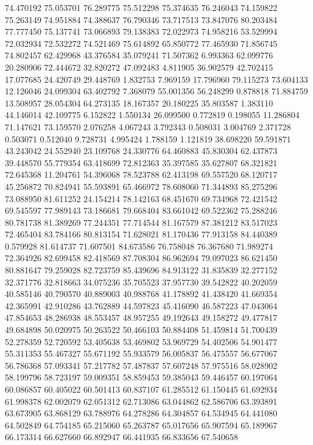 74.470192
75.053701
76.289775
75.512298
75.374635
76.246043
74.159822
75.263149
74.951884
74.388637
76.790346
73.717513
73.847076
80.203484
77.777450
75.137741
73.066893
79.138383
72.022973
74.958216
53.529994
72.032934
72.532272
74.521469
75.614892
65.850772
77.465930
71.856745
74.802457
62.429968
43.376584
35.079241
71.507362
6.993363
62.099776
20.280906
72.444672
32.820272
47.092483
4.811905
36.902579
42.702415
17.077685
24.420749
29.448769
1.832753
7.969159
17.796960
79.115273
73.604133
12.126046
24.099304
63.402792
7.368079
55.001356
56.248299
0.878818
71.884759
13.508957
28.054304
64.273135
18.167357
20.180225
35.803587
1.383110
44.146014
42.109775
6.152822
1.550134
26.099500
0.772819
0.198055
11.286804
71.147621
73.159570
2.076258
4.067243
3.792343
0.508031
3.004769
2.371728
0.503071
0.512040
9.728731
4.995424
1.788159
1.121819
38.698220
59.591871
43.243042
24.552940
23.109768
24.330776
64.460883
45.830304
62.437873
39.448570
55.779354
63.418699
72.812363
35.397585
35.627807
68.321821
72.645368
11.204761
54.396068
78.523788
62.413198
69.557520
68.120717
45.256872
70.824941
55.593891
65.466972
78.608060
71.344893
85.275296
73.088950
81.611252
24.154214
78.142163
68.451670
69.734968
72.421542
69.545597
77.989143
73.186681
79.668404
83.661042
69.522362
75.288246
80.781738
81.389269
77.244351
77.714544
81.167579
87.381212
83.517023
72.465404
83.784166
80.813154
71.628021
81.170436
77.913158
84.440389
0.579928
81.614737
71.607501
84.673586
76.758048
76.367680
71.989274
72.364926
82.699458
82.418569
87.708304
86.962694
79.097023
86.621450
80.881647
79.259028
82.723759
85.439696
84.913122
31.835839
32.277152
32.371776
32.818663
34.075236
35.705523
37.957730
39.542822
40.202059
40.585146
40.790570
40.889003
40.988768
41.178892
41.438420
41.669354
42.365991
42.910286
43.762889
44.597823
45.416090
46.587223
47.043064
47.854653
48.286938
48.553457
48.957255
49.192643
49.158272
49.477817
49.684898
50.020975
50.263522
50.466103
50.884408
51.459814
51.700439
52.278359
52.720592
53.405638
53.469802
53.969729
54.402506
54.901477
55.311353
55.467327
55.671192
55.933579
56.005837
56.475557
56.677067
56.786368
57.093341
57.217782
57.487837
57.607248
57.975516
58.028902
58.199796
58.723197
59.009351
58.859453
59.385043
59.446457
60.197064
60.086857
60.405022
60.501413
60.837107
61.285512
61.150445
61.692934
61.998378
62.002079
62.051312
62.713086
63.044862
62.586706
63.393891
63.673905
63.868129
63.788976
64.278286
64.304857
64.534945
64.441080
64.502849
64.754185
65.215060
65.263787
65.017656
65.907594
65.189967
66.173314
66.627660
66.892947
66.441935
66.833656
67.540658

